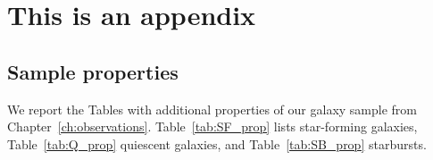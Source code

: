 
\chapter{This is an appendix}


\section{Sample properties} \label{appendix_observations}
We report the Tables with additional properties of our galaxy sample from Chapter~\ref{ch:observations}. Table~\ref{tab:SF_prop} lists star-forming galaxies, Table~\ref{tab:Q_prop}  quiescent galaxies, and Table~\ref{tab:SB_prop} starbursts.

